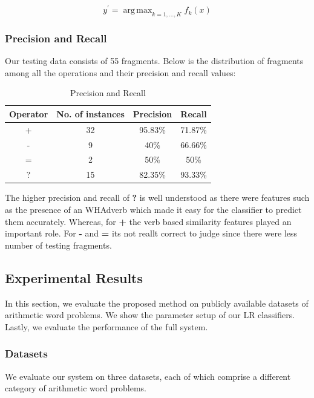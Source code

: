 \documentclass[11pt]{article}
\DeclareMathOperator*{\argmax}{arg\,max}
\begin{document}
\begin{equation}
y^{\prime} = \argmax_{k = 1,...,K} f_{k}(x)
\end{equation}

\subsubsection{Precision and Recall}
Our testing data consists of 55 fragments. Below is the distribution of fragments among all the operations and their precision and recall values:


\begin{table}[h]
\begin{center}
\begin{tabular}{|c|c|c|c|}
\hline
\bf Operator & \bf No. of instances & \bf Precision & \bf Recall \\
\hline
+ & 32 & 95.83\% & 71.87\% \\
\hline
- & 9 & 40\% & 66.66\% \\
\hline
= & 2 & 50\% & 50\% \\
\hline
? & 15 & 82.35\% & 93.33\% \\
\hline
\end{tabular}
\end{center}
\label{table:20}
\caption{Precision and Recall}
\end{table}

The higher precision and recall of \textbf{?} is well understood as there were features such as the presence of an WHAdverb which made it easy for the classifier to predict them accurately. Whereas, for \textbf{+} the verb based similarity features played an important role. For \textbf{-} and \textbf{=} its not reallt correct to judge since there were less number of testing fragments.

\subsection{Experimental Results}
In this section, we evaluate the proposed method on publicly available datasets of arithmetic word problems. We show the parameter setup of our LR classifiers. Lastly, we evaluate the performance of the full system.

\subsubsection{Datasets}
We evaluate our system on three datasets, each of which comprise a different category of arithmetic word problems.
\end{document}
